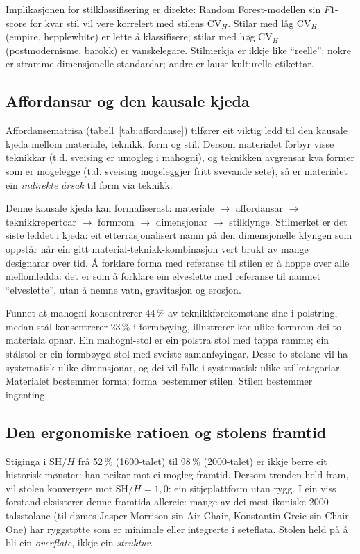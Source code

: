 \documentclass[10pt, a4paper, twocolumn]{article}
\begin{document}
Implikasjonen for stilklassifisering er direkte: Random Forest-modellen sin $F1$-score for kvar stil vil vere korrelert med stilens $\text{CV}_H$. Stilar med låg $\text{CV}_H$ (empire, hepplewhite) er lette å klassifisere; stilar med høg $\text{CV}_H$ (postmodernisme, barokk) er vanskelegare. Stilmerkja er ikkje like ``reelle'': nokre er stramme dimensjonelle standardar; andre er lause kulturelle etikettar.


\subsection{Affordansar og den kausale kjeda}

Affordansematrisa (tabell~\ref{tab:affordanse}) tilfører eit viktig ledd til den kausale kjeda mellom materiale, teknikk, form og stil. Dersom materialet forbyr visse teknikkar (t.d. sveising er umogleg i mahogni), og teknikken avgrensar kva former som er mogelegge (t.d. sveising mogeleggjer fritt svevande sete), så er materialet ein \emph{indirekte årsak} til form via teknikk.

Denne kausale kjeda kan formaliserast: materiale $\rightarrow$ affordansar $\rightarrow$ teknikkrepertoar $\rightarrow$ formrom $\rightarrow$ dimensjonar $\rightarrow$ stilklynge. Stilmerket er det siste leddet i kjeda: eit etterrasjonalisert namn på den dimensjonelle klyngen som oppstår når ein gitt material-teknikk-kombinasjon vert brukt av mange designarar over tid. Å forklare forma med referanse til stilen er å hoppe over alle mellomledda: det er som å forklare ein elveslette med referanse til namnet ``elveslette'', utan å nemne vatn, gravitasjon og erosjon.

Funnet at mahogni konsentrerer 44\,\% av teknikkførekomstane sine i polstring, medan stål konsentrerer 23\,\% i formbøying, illustrerer kor ulike formrom dei to materiala opnar. Ein mahogni-stol er ein polstra stol med tappa ramme; ein stålstol er ein formbøygd stol med sveiste samanføyingar. Desse to stolane vil ha systematisk ulike dimensjonar, og dei vil falle i systematisk ulike stilkategoriar. Materialet bestemmer forma; forma bestemmer stilen. Stilen bestemmer ingenting.


\subsection{Den ergonomiske ratioen og stolens framtid}

Stiginga i $\text{SH}/H$ frå 52\,\% (1600-talet) til 98\,\% (2000-talet) er ikkje berre eit historisk mønster: han peikar mot ei mogleg framtid. Dersom trenden held fram, vil stolen konvergere mot $\text{SH}/H = 1{,}0$: ein sitjeplattform utan rygg. I ein viss forstand eksisterer denne framtida allereie: mange av dei mest ikoniske 2000-talsstolane (til dømes Jasper Morrison sin Air-Chair, Konstantin Grcic sin Chair One) har ryggstøtte som er minimale eller integrerte i seteflata. Stolen held på å bli ein \emph{overflate}, ikkje ein \emph{struktur}.
\end{document}

